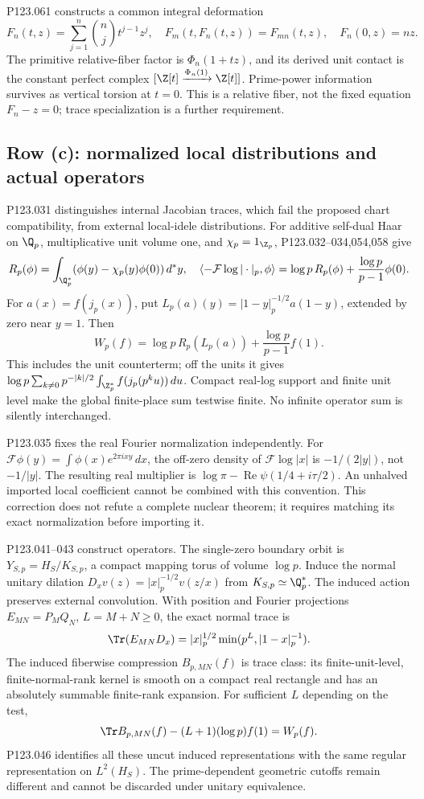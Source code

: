 P123.061 constructs a common integral deformation
\[
 F_n(t,z)=\sum_{j=1}^n\binom nj t^{j-1}z^j,
 \quad F_m(t,F_n(t,z))=F_{mn}(t,z),\quad F_n(0,z)=nz.
\]
The primitive relative-fiber factor is $\Phi_n(1+tz)$, and its derived
unit contact is the constant perfect complex
$[\Z[t]\xrightarrow{\Phi_n(1)}\Z[t]]$. Prime-power information survives
as vertical torsion at $t=0$. This is a relative fiber, not the fixed
equation $F_n-z=0$; trace specialization is a further requirement.

\subsection{Row (c): normalized local distributions and actual operators}
P123.031 distinguishes internal Jacobian traces, which fail the proposed
chart compatibility, from external local-idele distributions. For additive
self-dual Haar on $\Q_p$, multiplicative unit volume one, and
$\chi_p=1_{\Z_p}$, P123.032--034,054,058 give
\[
 R_p(\phi)=\int_{\Q_p^*}(\phi(y)-\chi_p(y)\phi(0))\,d^*y,
 \quad
 \langle-\mathcal F\log|\cdot|_p,\phi\rangle
 =\log p\,R_p(\phi)+\frac{\log p}{p-1}\phi(0).
\]
For $a(x)=f(j_p(x))$, put
$L_p(a)(y)=|1-y|_p^{-1/2}a(1-y)$, extended by zero near $y=1$.
Then
\[
 W_p(f)=\log p\,R_p(L_p(a))+\frac{\log p}{p-1}f(1).
\]
This includes the unit counterterm; off the units it gives
$\log p\sum_{k\ne0}p^{-|k|/2}\int_{\Z_p^*}f(j_p(p^ku))\,du$.
Compact real-log support and finite unit level make the global finite-place
sum testwise finite. No infinite operator sum is silently interchanged.

P123.035 fixes the real Fourier normalization independently. For
$\mathcal F\phi(y)=\int\phi(x)e^{2\pi ixy}\,dx$, the off-zero density
of $\mathcal F\log|x|$ is $-1/(2|y|)$, not $-1/|y|$.
The resulting real multiplier is
$\log\pi-\operatorname{Re}\psi(1/4+i\tau/2)$.
An unhalved imported local coefficient cannot be combined with this
convention. This correction does not refute a complete nuclear theorem;
it requires matching its exact normalization before importing it.

P123.041--043 construct operators. The single-zero boundary orbit is
$Y_{S,p}=H_S/K_{S,p}$, a compact mapping torus of volume $\log p$.
Induce the normal unitary dilation
$D_xv(z)=|x|_p^{-1/2}v(z/x)$ from $K_{S,p}\simeq\Q_p^*$.
The induced action preserves external convolution. With position and
Fourier projections $E_{MN}=P_MQ_N$, $L=M+N\ge0$, the exact normal trace is
\[
 \Tr(E_{MN}D_x)=|x|_p^{1/2}\min(p^L,|1-x|_p^{-1}).
\]
The induced fiberwise compression $B_{p,MN}(f)$ is trace class: its
finite-unit-level, finite-normal-rank kernel is smooth on a compact real
rectangle and has an absolutely summable finite-rank expansion. For
sufficient $L$ depending on the test,
\[
 \Tr B_{p,MN}(f)-(L+1)(\log p)f(1)=W_p(f).
\]
P123.046 identifies all these uncut induced representations with the same
regular representation on $L^2(H_S)$. The prime-dependent geometric
cutoffs remain different and cannot be discarded under unitary equivalence.


